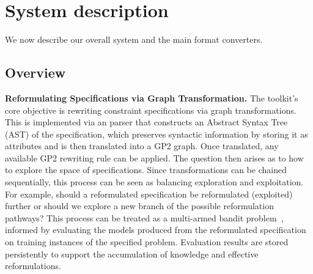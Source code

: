 \documentclass[runningheads]{llncs}
\begin{document}


\section{System description}

We now describe our overall system and the main format converters.

\subsection{Overview}

\noindent\textbf{Reformulating \essence Specifications via Graph Transformation.} The toolkit's core objective is rewriting \essence constraint specifications via graph transformations. This is implemented via an \essence parser that constructs an Abstract Syntax Tree (AST) of the specification, which preserves syntactic information by storing it as attributes and is then translated into a GP2 graph. Once translated, any available GP2 rewriting rule can be applied. The question then arises as to how to explore the space of \essence specifications. Since transformations can be chained sequentially, this process can be seen as balancing exploration and exploitation. For example, should a reformulated specification be reformulated (exploited) further or should we explore a new branch of the possible reformulation pathways?
This process can be treated as a multi-armed bandit problem~\cite{bandits-book}, informed by evaluating the models produced from the reformulated specification on training instances of the specified problem. Evaluation results are stored persistently to support the accumulation of knowledge and effective reformulations. 

\end{document}
